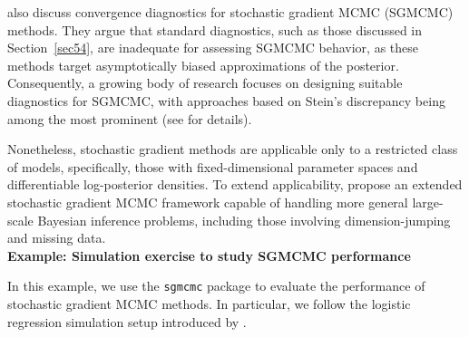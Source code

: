 \cite{nemeth2021stochastic} also discuss convergence diagnostics for stochastic gradient MCMC (SGMCMC) methods. They argue that standard diagnostics, such as those discussed in Section~\ref{sec54}, are inadequate for assessing SGMCMC behavior, as these methods target asymptotically biased approximations of the posterior. Consequently, a growing body of research focuses on designing suitable diagnostics for SGMCMC, with approaches based on Stein's discrepancy being among the most prominent (see \cite{nemeth2021stochastic} for details).

Nonetheless, stochastic gradient methods are applicable only to a restricted class of models, specifically, those with fixed-dimensional parameter spaces and differentiable log-posterior densities. To extend applicability, \cite{song2020extended} propose an extended stochastic gradient MCMC framework capable of handling more general large-scale Bayesian inference problems, including those involving dimension-jumping and missing data.\\

\textbf{Example: Simulation exercise to study SGMCMC performance}

In this example, we use the \texttt{sgmcmc} package \cite{baker2019sgmcmc} to evaluate the performance of stochastic gradient MCMC methods. In particular, we follow the logistic regression simulation setup introduced by \cite{nemeth2021stochastic}.
 


